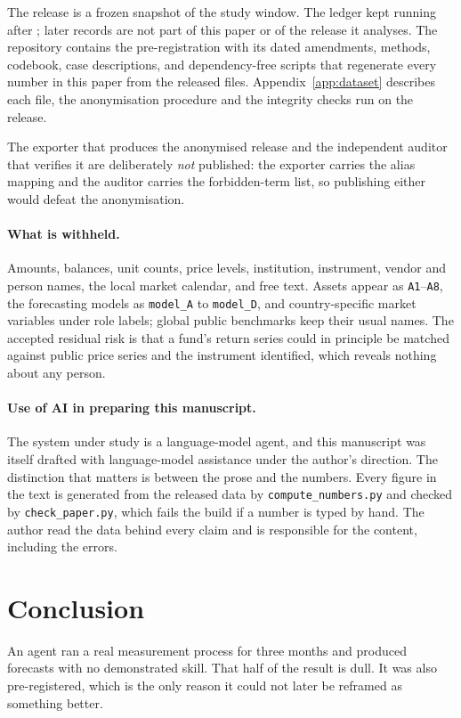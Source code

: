 \documentclass[11pt,a4paper]{article}
\newcommand{\modelA}{\texttt{model\_A}}
\newcommand{\modelD}{\texttt{model\_D}}
\begin{document}
The release is a frozen snapshot of the study window. The ledger kept running
after \WindowEnd; later records are not part of this paper or of the release
it analyses. The repository contains the pre-registration with its dated
amendments, methods, codebook, case descriptions, and dependency-free scripts
that regenerate every number in this paper from the released files.
Appendix~\ref{app:dataset} describes each file, the anonymisation procedure
and the integrity checks run on the release.

The exporter that produces the anonymised release and the independent auditor
that verifies it are deliberately \emph{not} published: the exporter carries
the alias mapping and the auditor carries the forbidden-term list, so
publishing either would defeat the anonymisation.

\paragraph{What is withheld.} Amounts, balances, unit counts, price levels,
institution, instrument, vendor and person names, the local market calendar,
and free text. Assets appear as \texttt{A1}--\texttt{A8}, the forecasting
models as \modelA{} to \modelD{}, and country-specific market variables under
role labels; global public benchmarks keep their usual names. The accepted
residual risk is that a fund's return series could in principle be matched
against public price series and the instrument identified, which reveals
nothing about any person.

\paragraph{Use of AI in preparing this manuscript.} The system under study is
a language-model agent, and this manuscript was itself drafted with
language-model assistance under the author's direction. The distinction that
matters is between the prose and the numbers. Every figure in the text is
generated from the released data by \texttt{compute\_numbers.py} and checked
by \texttt{check\_paper.py}, which fails the build if a number is typed by
hand. The author read the data behind every claim and is responsible for the
content, including the errors.

\section{Conclusion}

An agent ran a real measurement process for three months and produced
forecasts with no demonstrated skill. That half of the result is dull. It was
also pre-registered, which is the only reason it could not later be reframed
as something better.
\end{document}
